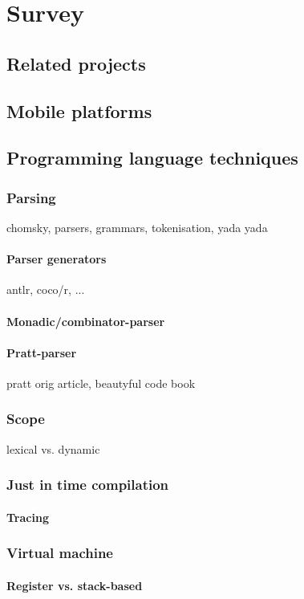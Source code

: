 \chapter{Survey}

\section{Related projects}

\section{Mobile platforms}

\section{Programming language techniques}
\subsection{Parsing}
chomsky, parsers, grammars, tokenisation, yada yada
\subsubsection{Parser generators}
antlr, coco/r, ...
\subsubsection{Monadic/combinator-parser}
\subsubsection{Pratt-parser}
pratt orig article, beautyful code book
\subsection{Scope}
lexical vs. dynamic
\subsection{Just in time compilation}
\subsubsection{Tracing}
\subsection{Virtual machine}
\subsubsection{Register vs. stack-based}
